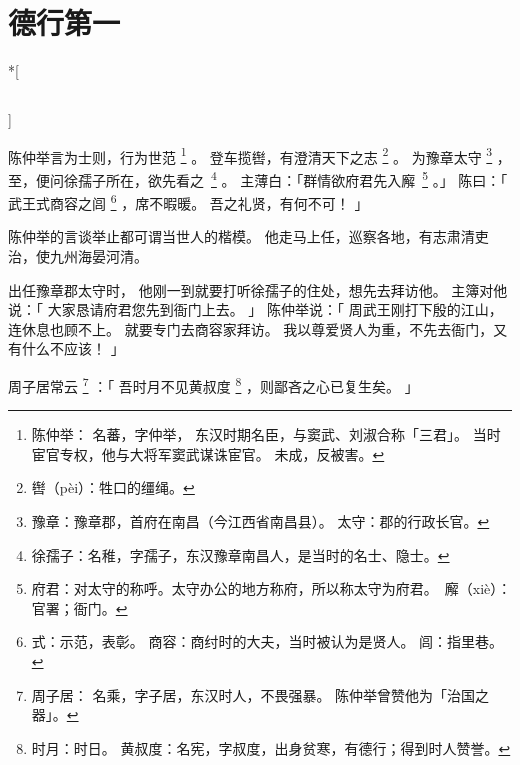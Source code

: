 
\chapter{德行第一}
\label{cha:de_xing_di_yi}

\begin{paracol}{2}

\switchcolumn[0]*[\section{}]

陈仲举言为士则，行为世范%
\footnote{%
    陈仲举：
    名蕃，字仲举，
    东汉时期名臣，与窦武、刘淑合称「三君」。
    当时宦官专权，他与大将军窦武谋诛宦官。
    未成，反被害。
}%
。
登车揽辔，有澄清天下之志%
\footnote{辔（pèi）：牲口的缰绳。}%
。
为豫章太守%
\footnote{%
    豫章：豫章郡，首府在南昌（今江西省南昌县）。
    太守：郡的行政长官。
}%
，
至，便问徐孺子所在，欲先看\mbox{之%
\footnote{徐孺子：名稚，字孺子，东汉豫章南昌人，是当时的名士、隐士。}}%
。
主薄白：「群情欲府君先入\mbox{廨%
\footnote{%
    府君：对太守的称呼。太守办公的地方称府，所以称太守为府君。
    廨（xiè）：官署；衙门。
}}%
。」
陈曰：「
    武王式商容之闾%
    \footnote{%
        式：示范，表彰。
        商容：商纣时的大夫，当时被认为是贤人。
        闾：指里巷。
    }%
    ，席不暇暖。
    吾之礼贤，有何不可！
」

\switchcolumn

陈仲举的言谈举止都可谓当世人的楷模。
他走马上任，巡察各地，有志肃清吏治，使九州海晏河清。

出任豫章郡太守时，
他刚一到就要打听徐孺子的住处，想先去拜访他。
主簿对他说：「
    大家恳请府君您先到衙门上去。
」
陈仲举说：「
    周武王刚打下殷的江山，
    连休息也顾不上。
    就要专门去商容家拜访。
    我以尊爱贤人为重，不先去衙门，又有什么不应该！
」


\switchcolumn*[\section{}]

周子居常云%
\footnote{%
    周子居：
    名乘，字子居，东汉时人，不畏强暴。
    陈仲举曾赞他为「治国之器」。
}%
：「
    吾时月不见黄叔度%
    \footnote{%
        时月：时日。
        黄叔度：名宪，字叔度，出身贫寒，有德行；得到时人赞誉。
    }%
    ，则鄙吝之心已复生矣。
」


\end{paracol}
